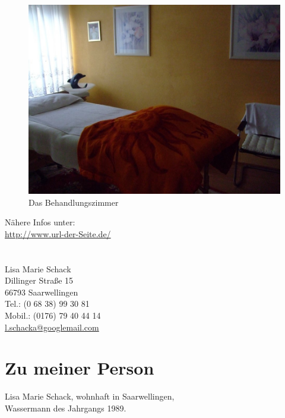 \documentclass[10pt,foldmark,notumble]{leaflet}
\begin{document}
\vspace*{20mm}
\begin{figure}[h]
 \includegraphics [scale=.25]{Bild1.jpg}
 \caption{Das Behandlungszimmer}
 \end{figure}

\begin{center}
Nähere Infos unter:\\
{\url{http://www.url-der-Seite.de/}} \\
\end{center}

\section{}%
Lisa Marie Schack\\
Dillinger Straße 15\\
66793 Saarwellingen\\
Tel.: (0 68 38) 99 30 81\\
Mobil.: (0176) 79 40 44 14\\
\href{mailto:l.schacka@googlemail.com}{l.schacka@googlemail.com} \\



\newpage

\section{Zu meiner Person}
Lisa Marie Schack, wohnhaft in Saarwellingen, \\
Wassermann des Jahrgangs 1989.
\end{document}

